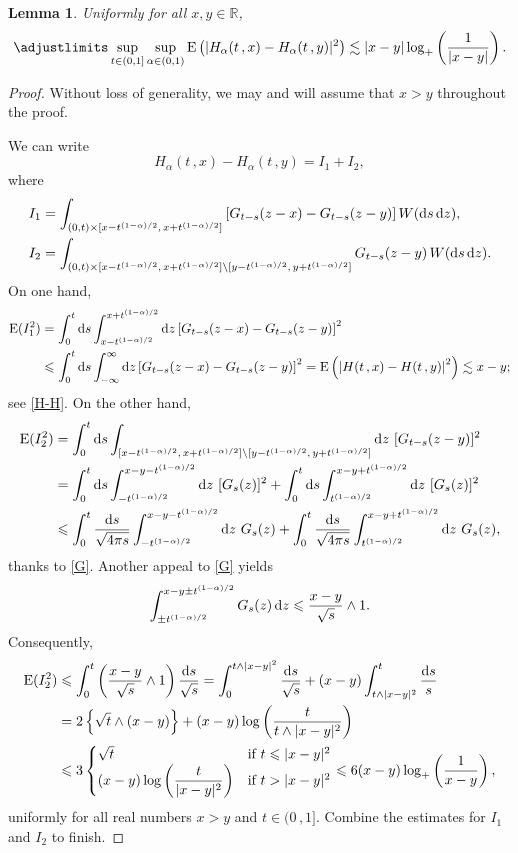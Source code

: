 \documentclass[reqno]{amsart}
\newcommand{\<}{\langle}
\renewcommand{\>}{\rangle}
\newcommand{\R}{\mathbb{R}}
\newcommand{\E}{\mathrm{E}}
\newcommand{\1}{\mathbb{1}}
\renewcommand{\d}{{\rm d}}
\renewcommand{\le}{\leqslant}
\newtheorem{lemma}[stat]{Lemma}
\theoremstyle{definition}
\numberwithin{equation}{section}
\begin{document}
\begin{lemma}\label{lem:H_alpha-H_alpha:x}
	Uniformly for all $x,y\in\R$, 
	\[
		\adjustlimits\sup_{t\in(0,1]}\sup_{\alpha\in(0,1)}
		\E\left(|H_\alpha(t\,,x) - H_\alpha(t\,,y)|^2\right) 
		\lesssim|x-y|\log_+\left(\frac{1}{|x-y|}\right).
	\]
\end{lemma}
\begin{proof}
	Without loss of generality, we may and will assume that
	$x>y$ throughout the proof.
	
	We can write
	\[
		H_\alpha(t\,,x) - H_\alpha(t\,,y) =I_1 + I_2,
	\]
	where
	\begin{align*}
		I_1 &= \int_{(0,t)\times[x-t^{(1-\alpha)/2},\,x+t^{(1-\alpha)/2}]}
			\left[G_{t-s}(z-x) - G_{t-s}(z-y)\right] W(\d s\,\d z),\\
		I_2 &=\int_{(0,t)\times[x-t^{(1-\alpha)/2},\,x+t^{(1-\alpha)/2}]
			\setminus [y-t^{(1-\alpha)/2},\,y+t^{(1-\alpha)/2}]}
			G_{t-s}(z-y)\,W(\d s\,\d z).
	\end{align*}
	On one hand,
	\begin{align*}
		\E(I_1^2)  &=  \int_0^t\d s\int_{x-t^{(1-\alpha)/2}}^{x+t^{(1-\alpha)/2}}\d z
			\left[G_{t-s}(z-x) - G_{t-s}(z-y)\right] ^2\\
		&\le \int_0^t\d s\int_{-\infty}^\infty\d z
			\left[G_{t-s}(z-x) - G_{t-s}(z-y)\right] ^2
			= \E\left(\left| H(t\,,x) - H(t\,,y)\right|^2 \right) \lesssim x-y;
	\end{align*}
	see \eqref{H-H}. On the other hand,
	\begin{align*}
		\E(I_2^2) &=\int_0^t\d s\int_{[x-t^{(1-\alpha)/2},\,x+t^{(1-\alpha)/2}]
			\setminus [y-t^{(1-\alpha)/2},\,y+t^{(1-\alpha)/2}]}\d z\ [G_{t-s}(z-y)]^2\\
		&=\int_0^t\d s\int_{-t^{(1-\alpha)/2}}^{x-y-t^{(1-\alpha)/2}}\d z\ [G_s(z)]^2
			+ \int_0^t\d s\int_{t^{(1-\alpha)/2}}^{x-y+t^{(1-\alpha)/2}}\d z\ [G_s(z)]^2\\
		&\le\int_0^t\frac{\d s}{\sqrt{4\pi s}}\int_{-t^{(1-\alpha)/2}}^{x-y-t^{(1-\alpha)/2}}\d z\ G_s(z)
			+ \int_0^t\frac{\d s}{\sqrt{4\pi s}}\int_{t^{(1-\alpha)/2}}^{x-y+t^{(1-\alpha)/2}}\d z\ G_s(z),
	\end{align*}
	thanks to \eqref{G}. Another appeal to \eqref{G} yields
	\[
		\int_{\pm t^{(1-\alpha)/2}}^{x-y\pm t^{(1-\alpha)/2}}G_s(z)\,\d z
		\le \frac{x-y}{\sqrt{s}}\wedge 1.
	\]
	Consequently,
	\begin{align*}
		\E(I_2^2) &\le \int_0^t\left(\frac{x-y}{\sqrt{s}}\wedge 1\right)
			\frac{\d s}{\sqrt{s}}
			=\int_0^{t\wedge |x-y|^2}\frac{\d s}{\sqrt s} +
			(x-y)\int_{t\wedge |x-y|^2}^t\frac{\d s}{s}\\
		&=2 \left\{\sqrt{t}\wedge(x-y)\right\} + (x-y)\log\left( \frac{t}{t\wedge |x-y|^2}\right)\\
		&\le 3\begin{cases}
			\sqrt t &\text{if $t\le |x-y|^2$}\\
			(x-y)\log\left(\dfrac{t}{|x-y|^2}\right)&\text{if $t>|x-y|^2$}
			\end{cases}
			\le 6(x-y)\log_+\left(\frac{1}{x-y}\right),
	\end{align*}
	uniformly for all real numbers $x>y$ and $t\in(0\,,1]$. Combine the estimates for $I_1$ and $I_2$
	to finish.
\end{proof}
\end{document}
